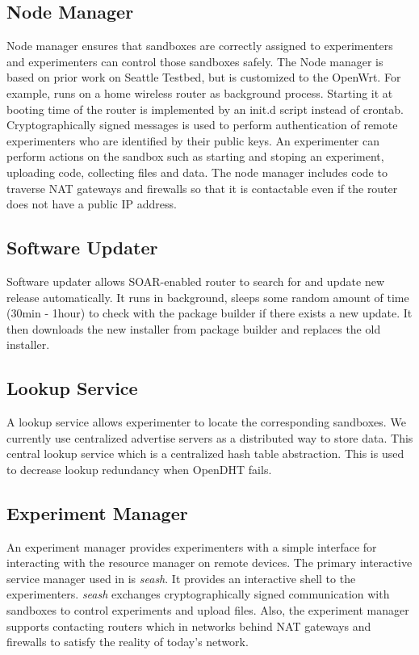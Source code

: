 \subsection{Node Manager}
\label{sec.nodemanager}
Node manager\cite{nodemanager} ensures that sandboxes are correctly assigned to experimenters and experimenters can control those sandboxes safely. The Node manager is based on prior work on Seattle Testbed, but is customized to the OpenWrt. For example, \sysname runs on a home wireless router as background process. Starting it at booting time of the router is implemented by an init.d script instead of crontab. Cryptographically signed messages is used to perform authentication of remote experimenters who are identified by their public keys. An experimenter can perform actions on the sandbox such as starting and stoping an experiment, uploading code, collecting files and data. The node manager includes code to traverse NAT gateways and firewalls so that it is contactable even if the router does not have a public IP address. 

\subsection{Software Updater}
\label{sec.softwareupdater}
Software updater allows SOAR-enabled router to search for and update new release automatically. It runs in background, sleeps some random amount of time (30min - 1hour) to check with the package builder if there exists a new update. It then downloads the new installer from package builder and replaces the old installer. 

\subsection{Lookup Service}
\label{sec.lookupservice}
A lookup service allows experimenter to locate the corresponding sandboxes. We currently use centralized advertise servers as a distributed way to store data. This central lookup service which is a centralized hash table abstraction. This is used to decrease lookup redundancy when OpenDHT fails.

\subsection{Experiment Manager}
\label{sec.seash}
An experiment manager provides experimenters with a simple interface for interacting with the resource manager on remote devices. The primary interactive service manager used in \sysname is \textit{seash}\cite{seash}. It provides an interactive shell to the experimenters. \textit{seash} exchanges cryptographically signed communication with sandboxes to control experiments and upload files. Also, the experiment manager supports contacting routers which in networks behind NAT gateways and firewalls to satisfy the reality of today's network.

